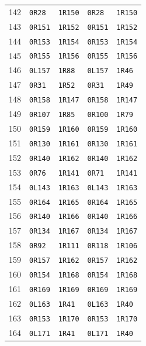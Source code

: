 {\begin{longtable}{rllll}
142 & \texttt{0R28} & \texttt{1R150} & \texttt{0R28} & \texttt{1R150}\\
143 & \texttt{0R151} & \texttt{1R152} & \texttt{0R151} & \texttt{1R152}\\
144 & \texttt{0R153} & \texttt{1R154} & \texttt{0R153} & \texttt{1R154}\\
145 & \texttt{0R155} & \texttt{1R156} & \texttt{0R155} & \texttt{1R156}\\
146 & \texttt{0L157} & \texttt{1R88} & \texttt{0L157} & \texttt{1R46}\\
147 & \texttt{0R31} & \texttt{1R52} & \texttt{0R31} & \texttt{1R49}\\
148 & \texttt{0R158} & \texttt{1R147} & \texttt{0R158} & \texttt{1R147}\\
149 & \texttt{0R107} & \texttt{1R85} & \texttt{0R100} & \texttt{1R79}\\
150 & \texttt{0R159} & \texttt{1R160} & \texttt{0R159} & \texttt{1R160}\\
151 & \texttt{0R130} & \texttt{1R161} & \texttt{0R130} & \texttt{1R161}\\
152 & \texttt{0R140} & \texttt{1R162} & \texttt{0R140} & \texttt{1R162}\\
153 & \texttt{0R76} & \texttt{1R141} & \texttt{0R71} & \texttt{1R141}\\
154 & \texttt{0L143} & \texttt{1R163} & \texttt{0L143} & \texttt{1R163}\\
155 & \texttt{0R164} & \texttt{1R165} & \texttt{0R164} & \texttt{1R165}\\
156 & \texttt{0R140} & \texttt{1R166} & \texttt{0R140} & \texttt{1R166}\\
157 & \texttt{0R134} & \texttt{1R167} & \texttt{0R134} & \texttt{1R167}\\
158 & \texttt{0R92} & \texttt{1R111} & \texttt{0R118} & \texttt{1R106}\\
159 & \texttt{0R157} & \texttt{1R162} & \texttt{0R157} & \texttt{1R162}\\
160 & \texttt{0R154} & \texttt{1R168} & \texttt{0R154} & \texttt{1R168}\\
161 & \texttt{0R169} & \texttt{1R169} & \texttt{0R169} & \texttt{1R169}\\
162 & \texttt{0L163} & \texttt{1R41} & \texttt{0L163} & \texttt{1R40}\\
163 & \texttt{0R153} & \texttt{1R170} & \texttt{0R153} & \texttt{1R170}\\
164 & \texttt{0L171} & \texttt{1R41} & \texttt{0L171} & \texttt{1R40}\\

\end{longtable}}
